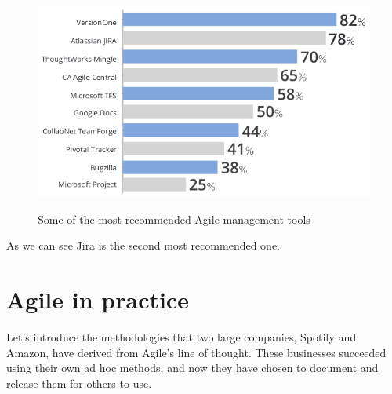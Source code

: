	\begin{figure}[H]
		\centering
		\includegraphics[width=.9\textwidth]{resources/Screenshot}\\
		\caption{Some of the most recommended Agile management tools}
	\end{figure}
	As we can see Jira is the second most recommended one.

\section{Agile in practice}
	Let's introduce the methodologies that two large companies, Spotify and Amazon, have derived from Agile's line of thought.
	These businesses succeeded using their own ad hoc methods, and now they have chosen to document and release them for others to use.
